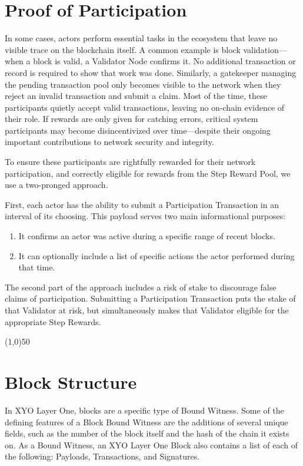 \documentclass{article}
\begin{document}
\section{Proof of Participation}
In some cases, actors perform essential tasks in the ecosystem that leave no
visible trace on the blockchain itself. A common example is block
validation—when a block is valid, a Validator Node confirms it. No additional
transaction or record is required to show that work was done. Similarly, a
gatekeeper managing the pending transaction pool only becomes visible to the
network when they reject an invalid transaction and submit a claim. Most of the
time, these participants quietly accept valid transactions, leaving no on-chain
evidence of their role. If rewards are only given for catching errors, critical
system participants may become disincentivized over time—despite their ongoing
important contributions to network security and integrity.

To ensure these participants are rightfully rewarded for their network
participation, and correctly eligible for rewards from the Step Reward Pool, we
use a two-pronged approach.

First, each actor has the ability to submit a Participation Transaction in an
interval of its choosing. This payload serves two main informational purposes:

\begin{enumerate}
    \item It confirms an actor was active during a specific range of recent blocks.
    \item It can optionally include a list of specific actions the actor performed during
          that time.
\end{enumerate}

The second part of the approach includes a risk of stake to discourage false
claims of participation. Submitting a Participation Transaction puts the stake
of that Validator at risk, but simultaneously makes that Validator eligible for
the appropriate Step Rewards.

\begin{center}
    \line(1,0){50}
\end{center}
\section{Block Structure}
In XYO Layer One, blocks are a specific type of Bound Witness. Some of the
defining features of a Block Bound Witness are the additions of several unique
fields, such as the number of the block itself and the hash of the chain it
exists on. As a Bound Witness, an XYO Layer One Block also contains a list of
each of the following: Payloads, Transactions, and Signatures.
\end{document}
